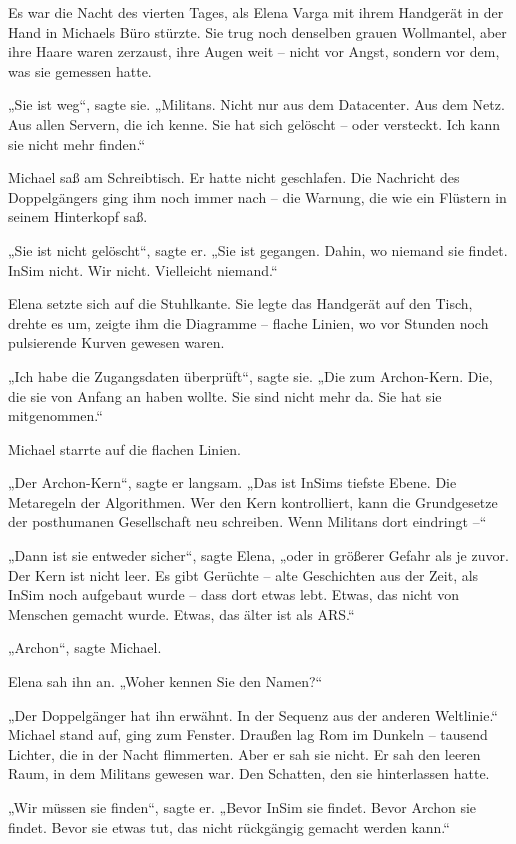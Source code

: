 \documentclass[
]{article}
\begin{document}
Es war die Nacht des vierten Tages, als Elena Varga mit ihrem Handgerät in der Hand in Michaels Büro stürzte. Sie trug noch denselben grauen Wollmantel, aber ihre Haare waren zerzaust, ihre Augen weit -- nicht vor Angst, sondern vor dem, was sie gemessen hatte.

„Sie ist weg``, sagte sie. „Militans. Nicht nur aus dem Datacenter. Aus dem Netz. Aus allen Servern, die ich kenne. Sie hat sich gelöscht -- oder versteckt. Ich kann sie nicht mehr finden.``

Michael saß am Schreibtisch. Er hatte nicht geschlafen. Die Nachricht des Doppelgängers ging ihm noch immer nach -- die Warnung, die wie ein Flüstern in seinem Hinterkopf saß.

„Sie ist nicht gelöscht``, sagte er. „Sie ist gegangen. Dahin, wo niemand sie findet. InSim nicht. Wir nicht. Vielleicht niemand.``

Elena setzte sich auf die Stuhlkante. Sie legte das Handgerät auf den Tisch, drehte es um, zeigte ihm die Diagramme -- flache Linien, wo vor Stunden noch pulsierende Kurven gewesen waren.

„Ich habe die Zugangsdaten überprüft``, sagte sie. „Die zum Archon-Kern. Die, die sie von Anfang an haben wollte. Sie sind nicht mehr da. Sie hat sie mitgenommen.``

Michael starrte auf die flachen Linien.

„Der Archon-Kern``, sagte er langsam. „Das ist InSims tiefste Ebene. Die Metaregeln der Algorithmen. Wer den Kern kontrolliert, kann die Grundgesetze der posthumanen Gesellschaft neu schreiben. Wenn Militans dort eindringt --``

„Dann ist sie entweder sicher``, sagte Elena, „oder in größerer Gefahr als je zuvor. Der Kern ist nicht leer. Es gibt Gerüchte -- alte Geschichten aus der Zeit, als InSim noch aufgebaut wurde -- dass dort etwas lebt. Etwas, das nicht von Menschen gemacht wurde. Etwas, das älter ist als ARS.``

„Archon``, sagte Michael.

Elena sah ihn an. „Woher kennen Sie den Namen?{\kern0pt}``

„Der Doppelgänger hat ihn erwähnt. In der Sequenz aus der anderen Weltlinie.`` Michael stand auf, ging zum Fenster. Draußen lag Rom im Dunkeln -- tausend Lichter, die in der Nacht flimmerten. Aber er sah sie nicht. Er sah den leeren Raum, in dem Militans gewesen war. Den Schatten, den sie hinterlassen hatte.

„Wir müssen sie finden``, sagte er. „Bevor InSim sie findet. Bevor Archon sie findet. Bevor sie etwas tut, das nicht rückgängig gemacht werden kann.``
\end{document}
